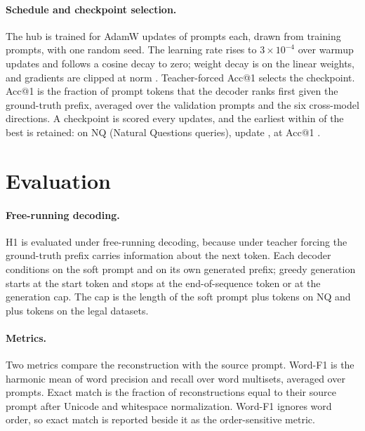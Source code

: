 \paragraph{Schedule and checkpoint selection.} The hub is trained for  AdamW updates of  prompts each, drawn from  training prompts, with one random seed.
The learning rate rises to $3\times10^{-4}$ over  warmup updates and follows a cosine decay to zero; weight decay is  on the linear weights, and gradients are clipped at norm . %
Teacher-forced Acc@1 selects the checkpoint.
Acc@1 is the fraction of prompt tokens that the decoder ranks first given the ground-truth prefix, averaged over the  validation prompts and the six cross-model directions.
A checkpoint is scored every  updates, and the earliest within  of the best is retained: on NQ (Natural Questions queries), update , at Acc@1 . %

\section{Evaluation}\label{sec:hub:eval}

\paragraph{Free-running decoding.} H1 is evaluated under free-running decoding, because under teacher forcing the ground-truth prefix carries information about the next token.
Each decoder conditions on the soft prompt and on its own generated prefix; greedy generation starts at the start token and stops at the end-of-sequence token or at the generation cap.
The cap is the length of the soft prompt plus  tokens on NQ and plus  tokens on the legal datasets. %

\paragraph{Metrics.} Two metrics compare the reconstruction with the source prompt.
Word-F1 is the harmonic mean of word precision and recall over word multisets, averaged over prompts.
Exact match is the fraction of reconstructions equal to their source prompt after Unicode and whitespace normalization.
Word-F1 ignores word order, so exact match is reported beside it as the order-sensitive metric.

